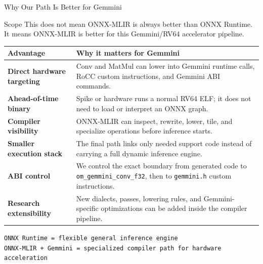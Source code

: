 \documentclass[aspectratio=169,10pt]{beamer}
\newcommand{\code}[1]{\texttt{\footnotesize #1}}
\newcommand{\edgeword}[1]{\textcolor{red!75!black}{\textbf{#1}}}
\begin{document}
\begin{frame}{Why Our Path Is Better for Gemmini}
  \scriptsize
  \begin{block}{Scope}
    This does not mean ONNX-MLIR is always better than ONNX Runtime. It means ONNX-MLIR is better for this Gemmini/RV64 accelerator pipeline.
  \end{block}

  \vspace{0.25em}
  \begin{tabularx}{\textwidth}{@{}lX@{}}
    \toprule
    Advantage & Why it matters for Gemmini \\
    \midrule
    \edgeword{Direct hardware targeting} &
      Conv and MatMul can lower into Gemmini runtime calls, RoCC custom instructions, and Gemmini ABI commands. \\
    \edgeword{Ahead-of-time binary} &
      Spike or hardware runs a normal RV64 ELF; it does not need to load or interpret an ONNX graph. \\
    \edgeword{Compiler visibility} &
      ONNX-MLIR can inspect, rewrite, lower, tile, and specialize operations before inference starts. \\
    \edgeword{Smaller execution stack} &
      The final path links only needed support code instead of carrying a full dynamic inference engine. \\
    \edgeword{ABI control} &
      We control the exact boundary from generated code to \code{om\_gemmini\_conv\_f32}, then to \code{gemmini.h} custom instructions. \\
    \edgeword{Research extensibility} &
      New dialects, passes, lowering rules, and Gemmini-specific optimizations can be added inside the compiler pipeline. \\
    \bottomrule
  \end{tabularx}

  \vspace{0.35em}
  \begin{center}
    \code{ONNX Runtime = flexible general inference engine}\\
    \code{ONNX-MLIR + Gemmini = specialized compiler path for hardware acceleration}
  \end{center}
\end{frame}
\end{document}
